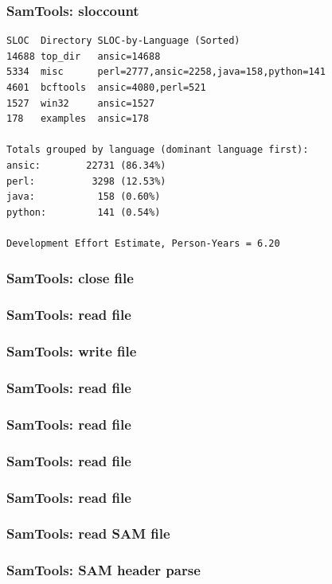 \begin{frame}[fragile]
\frametitle{SamTools: sloccount}
\begin{verbatim}
SLOC  Directory	SLOC-by-Language (Sorted)
14688 top_dir   ansic=14688
5334  misc      perl=2777,ansic=2258,java=158,python=141
4601  bcftools  ansic=4080,perl=521
1527  win32     ansic=1527
178   examples  ansic=178

Totals grouped by language (dominant language first):
ansic:        22731 (86.34%)
perl:          3298 (12.53%)
java:           158 (0.60%)
python:         141 (0.54%)

Development Effort Estimate, Person-Years = 6.20
\end{verbatim}
\end{frame}


\begin{frame}[fragile]
\frametitle{SamTools: close file}

\end{frame}

\begin{frame}[fragile]
\frametitle{SamTools: read file}

\end{frame}
\begin{frame}[fragile]
\frametitle{SamTools: write file}

\end{frame}

\begin{frame}[fragile]
\frametitle{SamTools: read file}

\end{frame}
\begin{frame}[fragile]
\frametitle{SamTools: read file}

\end{frame}
\begin{frame}[fragile]
\frametitle{SamTools: read file}

\end{frame}
\begin{frame}[fragile]
\frametitle{SamTools: read file}

\end{frame}
\begin{frame}[fragile]
\frametitle{SamTools: read SAM file}

\end{frame}


\begin{frame}[fragile]
\frametitle{SamTools: SAM header parse}

\end{frame}

